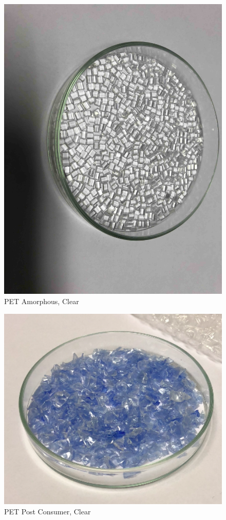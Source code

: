 \begin{appendices}
\begin{figure}
    \centering
    \includegraphics[width = 12cm]{Images/appendix/PET-pristine.jpg}
    \caption[$\; \:$PET Amorphous]{PET Amorphous, Clear}
    \label{fig:pet}
\end{figure}

\begin{figure}
    \centering
    \includegraphics[width = 12cm]{Images/appendix/PET-pc.png}
    \caption[$\; \:$PET Post Consumer]{PET Post Consumer, Clear}
    \label{fig:pet-pc}
\end{figure}


\end{appendices}
